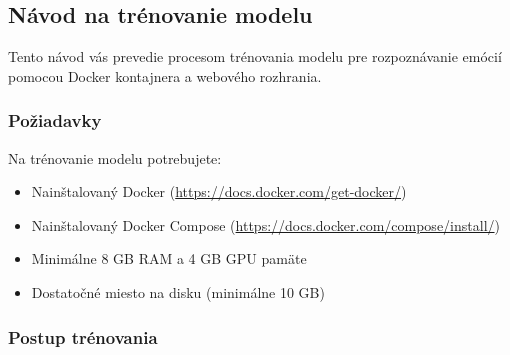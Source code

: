 \label{attachment:manual}

\subsection{Návod na trénovanie modelu}

Tento návod vás prevedie procesom trénovania modelu pre rozpoznávanie emócií pomocou Docker kontajnera a webového rozhrania.

\subsubsection{Požiadavky}
Na trénovanie modelu potrebujete:
\begin{itemize}
    \item Nainštalovaný Docker (\url{https://docs.docker.com/get-docker/})
    \item Nainštalovaný Docker Compose (\url{https://docs.docker.com/compose/install/})
    \item Minimálne 8 GB RAM a 4 GB GPU pamäte
    \item Dostatočné miesto na disku (minimálne 10 GB)
\end{itemize}

\subsubsection{Postup trénovania}

